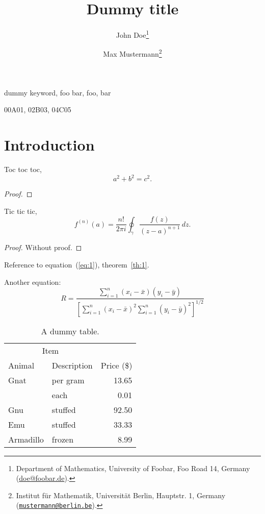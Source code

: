 \documentclass[draft,reqno]{etna}
\title{Dummy title}
\author{John Doe\thanks{Department of Mathematics, University of Foobar, Foo
Road 14, Germany (\url{doe@foobar.de}).}
\and
Max Mustermann\thanks{Institut f\"ur Mathematik, Universit\"at Berlin,
Hauptstr. 1, Germany
(\href{mailto:mustermann@berlin.de}{\nolinkurl{mustermann@berlin.be}}).}}
\begin{document}
\maketitle

\begin{abstract}
  \lipsum[1]
\end{abstract}

\begin{keywords}
   dummy keyword, foo bar, foo, bar
\end{keywords}

\begin{AMS}
  00A01, 02B03, 04C05
\end{AMS}

\section{Introduction}
\lipsum[2]

\begin{theorem}[Pythagoras]
Toc toc toc,
\begin{equation}
a^2 + b^2 = c^2.
\end{equation}
\end{theorem}
\begin{proof}
  \lipsum[1]
\end{proof}

\lipsum[3]

\begin{theorem}[Cauchy]\label{th:1}
  Tic tic tic,
  \begin{equation}\label{eq:1}
    f^{(n)}(a) = \frac{n!}{2\pi i} \oint_\gamma \frac{f(z)}{(z-a)^{n+1}}\, dz.
  \end{equation}
\end{theorem}
\begin{proof}
Without proof.
\end{proof}

Reference to equation~(\ref{eq:1}), theorem~\ref{th:1}.

Another equation:
\begin{equation}
  R = \frac{\displaystyle{\sum_{i=1}^n (x_i-\bar{x})(y_i-
\bar{y})}}{\displaystyle{\left[
\sum_{i=1}^n(x_i-\bar{x})^2
\sum_{i=1}^n(y_i-\bar{y})^2\right]^{1/2}}}
\end{equation}

\begin{table}
\centering
\caption{A dummy table.}
\begin{tabular}{llr}
\toprule
\multicolumn{2}{c}{Item} \\
\cmidrule(r){1-2}
Animal    & Description & Price (\$) \\
\midrule
Gnat      & per gram    & 13.65      \\
          & each        & 0.01       \\
Gnu       & stuffed     & 92.50      \\
Emu       & stuffed     & 33.33      \\
Armadillo & frozen      & 8.99       \\
\bottomrule
\end{tabular}
\end{table}
\end{document}

